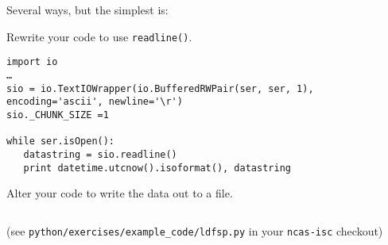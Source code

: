 \documentclass[a4paper,11pt]{article}
\begin{document}
\begin{solution}
Several ways, but the simplest is:

\noindent\usebox\serloop

\end{solution}

\begin{question}
Rewrite your code to use \texttt{readline()}.
\end{question}
\newsavebox\readlinebox
\begin{lrbox}{\readlinebox}
\begin{minipage}{\textwidth}
\begin{verbatim}
import io
…
sio = io.TextIOWrapper(io.BufferedRWPair(ser, ser, 1), encoding='ascii', newline='\r')
sio._CHUNK_SIZE =1

while ser.isOpen():
   datastring = sio.readline()
   print datetime.utcnow().isoformat(), datastring
\end{verbatim}
\end{minipage}
\end{lrbox}

\begin{solution}
\noindent\usebox\readlinebox
\end{solution}
\begin{question}
Alter your code to write the data out to a file.
\end{question}

\newsavebox\logfile
\begin{lrbox}{\logfile}
\begin{minipage}{\textwidth}
\inputminted[bgcolor=lightyellow]{python}{../../../python/exercises/example_code/ldfsp.py}
\end{minipage}
\end{lrbox}
\begin{solution}
\noindent\usebox\logfile
\par
(see \texttt{python/exercises/example\_code/ldfsp.py} in your \texttt{ncas-isc} checkout)
\end{solution}
\newpage
\printsolutions
\newpage
\end{document}
